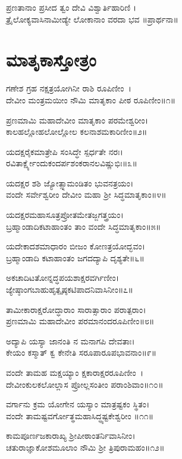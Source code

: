 ಪ್ರಣತಾನಾಂ ಪ್ರಸೀದ ತ್ವಂ ದೇವಿ ವಿಶ್ವಾರ್ತಿಹಾರಿಣಿ ।\\ತ್ರೈಲೋಕ್ಯವಾಸಿನಾಮೀಡ್ಯೇ ಲೋಕಾನಾಂ ವರದಾ ಭವ ॥ಪ್ರಾರ್ಥನಾ॥

\section{ಮಾತೃಕಾಸ್ತೋತ್ರಂ}
ಗಣೇಶ ಗ್ರಹ ನಕ್ಷತ್ರಯೋಗಿನೀ ರಾಶಿ ರೂಪಿಣೀಂ~।\\
ದೇವೀಂ ಮಂತ್ರಮಯೀಂ ನೌಮಿ ಮಾತೃಕಾಂ ಪೀಠ ರೂಪಿಣೀಂ॥೧॥

ಪ್ರಣಮಾಮಿ ಮಹಾದೇವೀಂ ಮಾತೃಕಾಂ ಪರಮೇಶ್ವರೀಂ।\\
ಕಾಲಹಲ್ಲೋಹಲೋಲ್ಲೋಲ ಕಲನಾಶಮಕಾರಿಣೀಂ॥೨॥

ಯದಕ್ಷರೈಕಮಾತ್ರೇಪಿ ಸಂಸಿದ್ಧೇ ಸ್ಪರ್ಧತೇ ನರಃ।\\
ರವಿತಾರ್ಕ್ಷ್ಯೇಂದುಕಂದರ್ಪಶಂಕರಾನಲವಿಷ್ಣುಭಿಃ॥೩॥

ಯದಕ್ಷರ ಶಶಿ ಜ್ಯೋತ್ಸ್ನಾಮಂಡಿತಂ ಭುವನತ್ರಯಂ।\\
ವಂದೇ ಸರ್ವೇಶ್ವರೀಂ ದೇವೀಂ ಮಹಾ ಶ್ರೀ ಸಿದ್ಧಮಾತೃಕಾಂ॥೪॥

ಯದಕ್ಷರಮಹಾಸೂತ್ರಪ್ರೋತಮೇತಜ್ಜಗತ್ತ್ರಯಂ।\\
ಬ್ರಹ್ಮಾಂಡಾದಿಕಟಾಹಾಂತಂ ತಾಂ ವಂದೇ ಸಿದ್ಧಮಾತೃಕಾಂ॥೫॥

ಯದೇಕಾದಶಮಾಧಾರಂ ಬೀಜಂ ಕೋಣತ್ರಯೋದ್ಭವಂ।\\
ಬ್ರಹ್ಮಾಂಡಾದಿ ಕಟಾಹಾಂತಂ ಜಗದದ್ಯಾಪಿ ದೃಶ್ಯತೇ॥೬॥

ಅಕಚಾದಿಟತೋನ್ನದ್ಧಪಯಶಾಕ್ಷರವರ್ಗಿಣೀಂ।\\
ಜ್ಯೇಷ್ಠಾಂಗಬಾಹುಹೃತ್ಪೃಷ್ಠಕಟಿಪಾದನಿವಾಸಿನೀಂ॥೭॥

ತಾಮೀಕಾರಾಕ್ಷರೋದ್ಧಾರಾಂ ಸಾರಾತ್ಸಾರಾಂ ಪರಾತ್ಪರಾಂ।\\
ಪ್ರಣಮಾಮಿ ಮಹಾದೇವೀಂ ಪರಮಾನಂದರೂಪಿಣೀಂ॥೮॥

ಅದ್ಯಾಪಿ ಯಸ್ಯಾ ಜಾನಂತಿ ನ ಮನಾಗಪಿ ದೇವತಾಃ।\\
ಕೇಯಂ ಕಸ್ಮಾತ್ ಕ್ವ ಕೇನೇತಿ ಸರೂಪಾರೂಪಭಾವನಾಂ॥೯॥

ವಂದೇ ತಾಮಹ ಮಕ್ಷಯ್ಯಾಂ ಕ್ಷಕಾರಾಕ್ಷರರೂಪಿಣೀಂ~।\\
ದೇವೀಂಕುಲಕಲೋಲ್ಲಾಸ ಪ್ರೋಲ್ಲಸಂತೀಂ ಪರಾಂಶಿವಾಂ॥೧೦॥

ವರ್ಗಾನು ಕ್ರಮ ಯೋಗೇನ ಯಸ್ಯಾಂ ಮಾತ್ರಷ್ಟಕಂ ಸ್ಥಿತಂ।\\
ವಂದೇ ತಾಮಷ್ಟವರ್ಗೋತ್ಥಮಹಾಸಿದ್ಧ್ಯಷ್ಟಕೇಶ್ವರೀಂ ॥೧೧॥

ಕಾಮಪೂರ್ಣಜಕಾರಾಖ್ಯ ಶ್ರೀಪೀಠಾಂತರ್ನಿವಾಸಿನೀಂ।\\
ಚತುರಾಜ್ಞಾಕೋಶಮೂಲಾಂ ನೌಮಿ ಶ್ರೀ ತ್ರಿಪುರಾಮಹಂ॥೧೨॥


